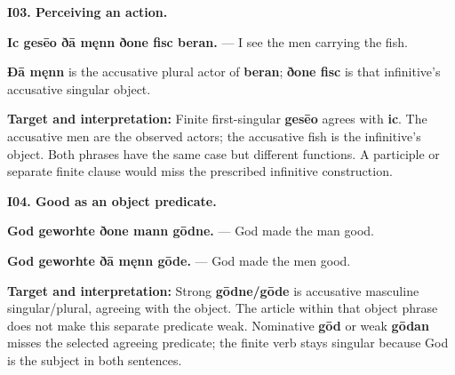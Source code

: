 \par\begin{minipage}{\linewidth}\raggedright
\textbf{I03. Perceiving an action.}

\textbf{Ic gesēo ðā męnn ðone fisc beran.} — I see the men carrying the fish.

\textbf{Ðā męnn} is the accusative plural actor of \textbf{beran}; \textbf{ðone fisc} is that infinitive's accusative singular object.

\textbf{Target and interpretation:} Finite first-singular \textbf{gesēo} agrees with \textbf{ic}. The accusative men are the observed actors; the accusative fish is the infinitive's object. Both phrases have the same case but different functions. A participle or separate finite clause would miss the prescribed infinitive construction.

\end{minipage}\par\addvspace{4pt}

\par\begin{minipage}{\linewidth}\raggedright
\textbf{I04. Good as an object predicate.}

\textbf{God geworhte ðone mann gōdne.} — God made the man good.

\textbf{God geworhte ðā męnn gōde.} — God made the men good.

\textbf{Target and interpretation:} Strong \textbf{gōdne/\allowbreak{}gōde} is accusative masculine singular/\allowbreak{}plural, agreeing with the object. The article within that object phrase does not make this separate predicate weak. Nominative \textbf{gōd} or weak \textbf{gōdan} misses the selected agreeing predicate; the finite verb stays singular because God is the subject in both sentences.

\end{minipage}\par\addvspace{4pt}

